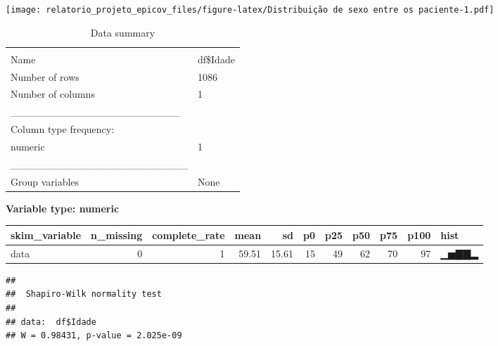 \documentclass[
]{article}
\newenvironment{Shaded}{\begin{snugshade}}{\end{snugshade}}
\newcommand{\CommentTok}[1]{\textcolor[rgb]{0.56,0.35,0.01}{\textit{#1}}}
\newcommand{\FunctionTok}[1]{\textcolor[rgb]{0.00,0.00,0.00}{#1}}
\newcommand{\NormalTok}[1]{#1}
\newcommand{\SpecialCharTok}[1]{\textcolor[rgb]{0.00,0.00,0.00}{#1}}
\begin{document}
\texttt{[image: relatorio\_projeto\_epicov\_files/figure-latex/Distribuição de sexo entre os paciente-1.pdf]}

\begin{Shaded}
\end{Shaded}

\begin{longtable}[]{@{}ll@{}}
\caption{Data summary}\tabularnewline
\toprule
& \\
\midrule
\endfirsthead
\toprule
& \\
\midrule
\endhead
Name & df\$Idade \\
Number of rows & 1086 \\
Number of columns & 1 \\
\_\_\_\_\_\_\_\_\_\_\_\_\_\_\_\_\_\_\_\_\_\_\_ & \\
Column type frequency: & \\
numeric & 1 \\
\_\_\_\_\_\_\_\_\_\_\_\_\_\_\_\_\_\_\_\_\_\_\_\_ & \\
Group variables & None \\
\bottomrule
\end{longtable}

\textbf{Variable type: numeric}

\begin{longtable}[]{@{}lrrrrrrrrrl@{}}
\toprule
skim\_variable & n\_missing & complete\_rate & mean & sd & p0 & p25 &
p50 & p75 & p100 & hist \\
\midrule
\endhead
data & 0 & 1 & 59.51 & 15.61 & 15 & 49 & 62 & 70 & 97 & ▁▅▇▇▂ \\
\bottomrule
\end{longtable}

\begin{Shaded}
\end{Shaded}

\begin{verbatim}
## 
##  Shapiro-Wilk normality test
## 
## data:  df$Idade
## W = 0.98431, p-value = 2.025e-09
\end{verbatim}
\end{document}
